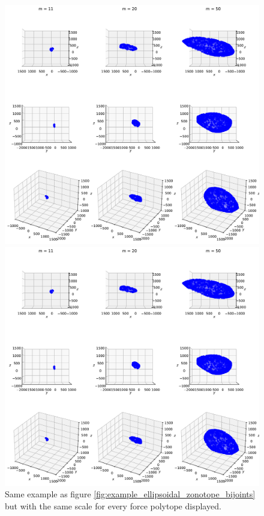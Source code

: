 \begin{figure}[!htb]
\begin{minipage}{1\linewidth}
    \end{minipage}
    \begin{minipage}{1\linewidth}
        \centering
        \includegraphics[trim={0 255 0 300},clip, width=0.9\linewidth]{img/chapter_3/zonotopes_looks_like_ellipsoids_2_same_scale.pdf}
    \end{minipage}
    \begin{minipage}{1\linewidth}
        \centering
        \includegraphics[trim={0 0 0 500},clip, width=0.9\linewidth]{img/chapter_3/zonotopes_looks_like_ellipsoids_2_same_scale.pdf}
    \end{minipage}
    
    \caption{Same example as figure \ref{fig:example_ellipsoidal_zonotope_bijoints} but with the same scale for every force polytope displayed.}
    \label{fig:example_ellipsoidal_zonotope_bijoints_same_scale}
\end{figure}

